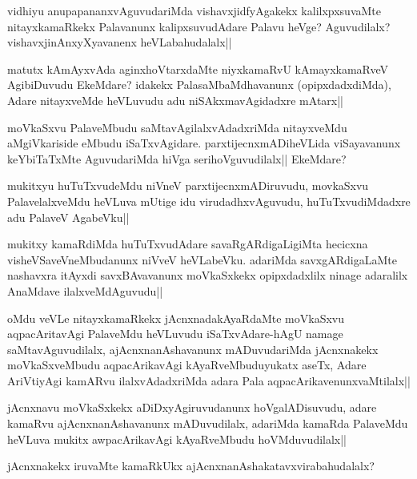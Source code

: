 \begin{artha}
vidhiyu anupapananxvAguvudariMda vishavxjidfyAgakekx kalilxpxsuvaMte nitayxkamaRkekx Palavanunx kalipxsuvudAdare Palavu heVge? Aguvudilalx? vishavxjinAnxyXyavanenx heVLabahudalalx||
\end{artha}

\begin{artha}
matutx kAmAyxvAda aginxhoVtarxdaMte niyxkamaRvU kAmayxkamaRveV AgibiDuvudu EkeMdare? idakekx PalasaMbaMdhavanunx (opipxdadxdiMda), Adare nitayxveMde heVLuvudu adu niSAkxmavAgidadxre mAtarx||
\end{artha}

\begin{artha}
moVkaSxvu PalaveMbudu saMtavAgilalxvAdadxriMda nitayxveMdu aMgiVkariside eMbudu iSaTxvAgidare. parxtijecnxmADiheVLida viSayavanunx keYbiTaTxMte AguvudariMda hiVga serihoVguvudilalx|| EkeMdare?
\end{artha}

\begin{artha}
mukitxyu huTuTxvudeMdu niVneV parxtijecnxmADiruvudu, movkaSxvu PalavelalxveMdu heVLuva mUtige idu virudadhxvAguvudu, huTuTxvudiMdadxre adu PalaveV AgabeVku||
\end{artha}

\begin{artha}
mukitxy kamaRdiMda huTuTxvudAdare savaRgARdigaLigiMta hecicxna visheVSaveVneMbudanunx niVveV heVLabeVku. adariMda savxgARdigaLaMte nashavxra itAyxdi savxBAvavanunx moVkaSxkekx opipxdadxlilx ninage adaralilx AnaMdave ilalxveMdAguvudu||
\end{artha}

\begin{artha}
oMdu veVLe nitayxkamaRkekx jAcnxnadakAyaRdaMte moVkaSxvu aqpacAritavAgi PalaveMdu heVLuvudu iSaTxvAdare-hAgU namage saMtavAguvudilalx, ajAcnxnanAshavanunx mADuvudariMda jAcnxnakekx moVkaSxveMbudu aqpacArikavAgi kAyaRveMbuduyukatx aseTx, Adare AriVtiyAgi kamARvu ilalxvAdadxriMda adara Pala aqpacArikavenunxvaMtilalx||
\end{artha}

\begin{artha}
jAcnxnavu moVkaSxkekx aDiDxyAgiruvudanunx hoVgalADisuvudu, adare kamaRvu ajAcnxnanAshavanunx mADuvudilalx, adariMda kamaRda PalaveMdu heVLuva mukitx awpacArikavAgi kAyaRveMbudu hoVMduvudilalx||
\end{artha}

\begin{artha}
jAcnxnakekx iruvaMte kamaRkUkx ajAcnxnanAshakatavxvirabahudalalx?
\end{artha}

